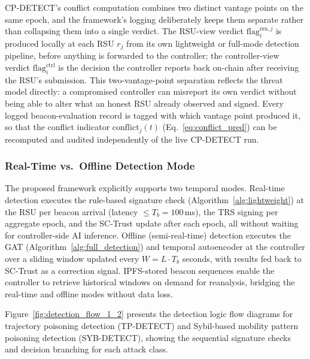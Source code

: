 \documentclass[12pt, a4paper]{report}
\begin{document}
CP-DETECT's conflict computation combines two distinct vantage points
on the same epoch, and the framework's logging deliberately keeps them
separate rather than collapsing them into a single verdict. The
RSU-view verdict $\mathrm{flag}_i^{\mathrm{rsu},j}$ is produced locally
at each RSU $r_j$ from its own lightweight or full-mode detection
pipeline, before anything is forwarded to the controller; the
controller-view verdict $\mathrm{flag}_i^{\mathrm{ctrl}}$ is the
decision the controller reports back on-chain after receiving the
RSU's submission. This two-vantage-point separation reflects the
threat model directly: a compromised controller can misreport its own
verdict without being able to alter what an honest RSU already
observed and signed. Every logged beacon-evaluation record is tagged
with which vantage point produced it, so that the conflict indicator
$\mathrm{conflict}_j(t)$ (Eq.~\ref{eq:conflict_pred}) can be
recomputed and audited independently of the live CP-DETECT run.

\subsubsection{Real-Time vs.\ Offline Detection Mode}

The proposed framework explicitly supports two temporal modes.
Real-time detection executes the rule-based signature check
(Algorithm~\ref{alg:lightweight}) at the RSU per beacon arrival
(latency $\leq T_b = 100$\,ms), the TRS signing per aggregate epoch,
and the SC-Trust update after each epoch, all without waiting for
controller-side AI inference. Offline (semi-real-time) detection
executes the GAT (Algorithm~\ref{alg:full_detection}) and temporal
autoencoder at the controller over a sliding window updated every
$W = L \cdot T_b$ seconds, with results fed back to SC-Trust as
a correction signal. IPFS-stored beacon sequences enable the
controller to retrieve historical windows on demand for reanalysis,
bridging the real-time and offline modes without data loss.

Figure~\ref{fig:detection_flow_1_2} presents the detection logic flow diagrams for trajectory poisoning detection (TP-DETECT) and Sybil-based mobility pattern poisoning detection (SYB-DETECT), showing the sequential signature checks and decision branching for each attack class.
\end{document}
